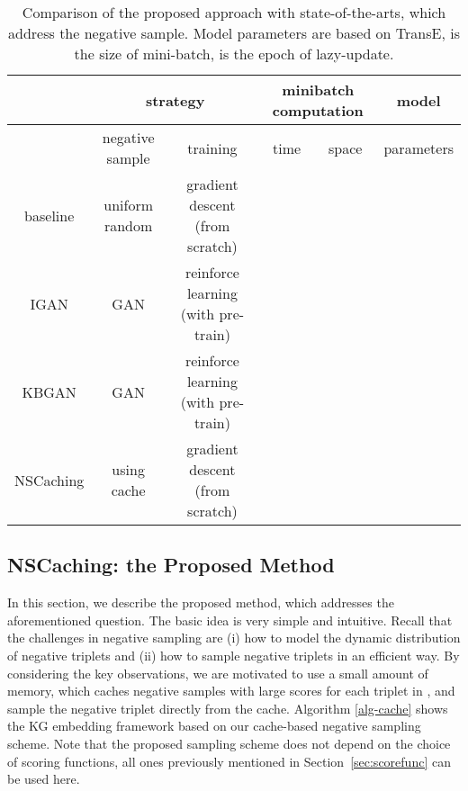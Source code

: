 \documentclass[conference]{IEEEtran}
\begin{document}
\begin{table*}[ht]
	\caption{Comparison of the proposed approach with state-of-the-arts,
		which address the negative sample.
		Model parameters are based on TransE,
		 is the size of mini-batch,
		 is the epoch of lazy-update.
		}
	\centering
	\label{tab:compare}
\renewcommand{\arraystretch}{1.3}
	\begin{tabular}{c | c | c | c | c | c }
		\hline
		                                  &             \multicolumn{2}{c|}{strategy}             &  \multicolumn{2}{c|}{minibatch computation}   & model                             \\ \hline
		                                  & negative sample & training                            & time                  & space                 & parameters                        \\ \hline
		            baseline              & uniform random  & gradient descent (from scratch)     &               &               &   \\ \hline
		IGAN \cite{wang2018incorporating} & GAN             & reinforce learning (with pre-train) &  &  &  \\ \hline
		    KBGAN \cite{cai2018kbgan}     & GAN             & reinforce learning (with pre-train) &           &          &  \\ \hline
		            NSCaching              & using cache     & gradient descent (from scratch)     &       &     &   \\ \hline
	\end{tabular}
\end{table*}



\subsection{NSCaching: the Proposed Method}
\label{sec:NSCaching}

In this section,
we describe the proposed method,
which addresses the aforementioned question.
The basic idea is very simple and intuitive.
Recall that the challenges in negative sampling 
are (i) how to model the dynamic distribution of negative triplets 
and (ii) how to sample negative triplets in an efficient way.
By considering the key observations,
we are motivated to use a small amount of memory,
which caches negative samples with large scores for each triplet in ,
and sample the negative triplet directly from the cache. 
Algorithm \ref{alg-cache} shows the KG embedding framework based on our cache-based negative sampling scheme.
Note that the proposed sampling scheme does not depend on the choice of scoring functions,
all ones previously mentioned in Section~\ref{sec:scorefunc} can be used here.
\end{document}
